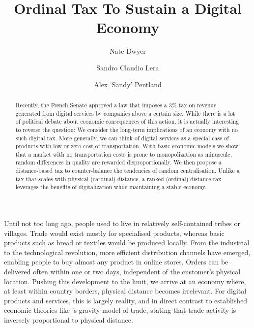 \documentclass[final,5p,times,twocolumn,11pt,authoryear]{elsarticle}
\numberwithin{equation}{section} %
\begin{document}
\begin{frontmatter}

\title{Ordinal Tax To Sustain a Digital Economy}

\author{Nate Dwyer}

\author{Sandro Claudio Lera}

\author{Alex `Sandy' Pentland}

\address{Massachusetts Institute of Technology, 77 Massachusetts Avenue, 02139 Cambridge, Massachusetts, USA}

\begin{abstract}

Recently, the French Senate approved a law that imposes a $3\%$ tax on revenue generated from digital services by companies above a certain size. 
While there is a lot of political debate about economic consequences of this action, it is actually interesting to reverse the question: 
We consider the long-term implications of an economy with no such digital tax. 
More generally, we can think of digital services as a special case of products with low or zero cost of transportation. 
With basic economic models we show that a market with no transportation costs is prone to monopolization as minuscule, random differences in quality are rewarded disproportionally. 
We then propose a distance-based tax to counter-balance the tendencies of random centralisation.  
Unlike a tax that scales with physical (cardinal) distance, a ranked (ordinal) distance tax leverages the benefits of digitalization while maintaining a stable economy. 

\end{abstract} 

\end{frontmatter}

Until not too long ago, people used to live in relatively self-contained tribes or villages. 
Trade would exist mostly for specialised products, whereas basic products such as bread or textiles would be produced locally. 
From the industrial to the technological revolution, more efficient distribution channels have emerged, enabling people to buy almost any product in online stores. 
Orders can be delivered often within one or two days, independent of the customer’s physical location. 
Pushing this development to the limit, we arrive at an economy where, at least within country borders, physical distance becomes irrelevant. 
For digital products and services, this is largely reality, and in direct contrast to established economic theories like \cite{Isard1954}'s gravity model of trade, stating that trade activity is inversely proportional to physical distance. 
\end{document}
